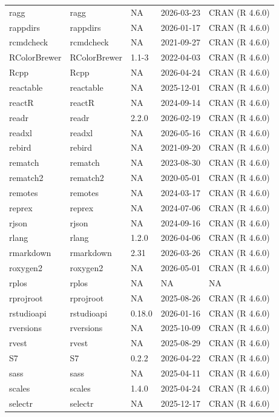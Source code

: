 \documentclass[
]{book}
\begin{document}
\begin{tabular}{lllll}
ragg & ragg & NA & 2026-03-23 & CRAN (R 4.6.0)\\
rappdirs & rappdirs & NA & 2026-01-17 & CRAN (R 4.6.0)\\
rcmdcheck & rcmdcheck & NA & 2021-09-27 & CRAN (R 4.6.0)\\
RColorBrewer & RColorBrewer & 1.1-3 & 2022-04-03 & CRAN (R 4.6.0)\\
\addlinespace
Rcpp & Rcpp & NA & 2026-04-24 & CRAN (R 4.6.0)\\
reactable & reactable & NA & 2025-12-01 & CRAN (R 4.6.0)\\
reactR & reactR & NA & 2024-09-14 & CRAN (R 4.6.0)\\
readr & readr & 2.2.0 & 2026-02-19 & CRAN (R 4.6.0)\\
readxl & readxl & NA & 2026-05-16 & CRAN (R 4.6.0)\\
\addlinespace
rebird & rebird & NA & 2021-09-20 & CRAN (R 4.6.0)\\
rematch & rematch & NA & 2023-08-30 & CRAN (R 4.6.0)\\
rematch2 & rematch2 & NA & 2020-05-01 & CRAN (R 4.6.0)\\
remotes & remotes & NA & 2024-03-17 & CRAN (R 4.6.0)\\
reprex & reprex & NA & 2024-07-06 & CRAN (R 4.6.0)\\
\addlinespace
rjson & rjson & NA & 2024-09-16 & CRAN (R 4.6.0)\\
rlang & rlang & 1.2.0 & 2026-04-06 & CRAN (R 4.6.0)\\
rmarkdown & rmarkdown & 2.31 & 2026-03-26 & CRAN (R 4.6.0)\\
roxygen2 & roxygen2 & NA & 2026-05-01 & CRAN (R 4.6.0)\\
rplos & rplos & NA & NA & NA\\
\addlinespace
rprojroot & rprojroot & NA & 2025-08-26 & CRAN (R 4.6.0)\\
rstudioapi & rstudioapi & 0.18.0 & 2026-01-16 & CRAN (R 4.6.0)\\
rversions & rversions & NA & 2025-10-09 & CRAN (R 4.6.0)\\
rvest & rvest & NA & 2025-08-29 & CRAN (R 4.6.0)\\
S7 & S7 & 0.2.2 & 2026-04-22 & CRAN (R 4.6.0)\\
\addlinespace
sass & sass & NA & 2025-04-11 & CRAN (R 4.6.0)\\
scales & scales & 1.4.0 & 2025-04-24 & CRAN (R 4.6.0)\\
selectr & selectr & NA & 2025-12-17 & CRAN (R 4.6.0)\\

\end{tabular}
\end{document}
